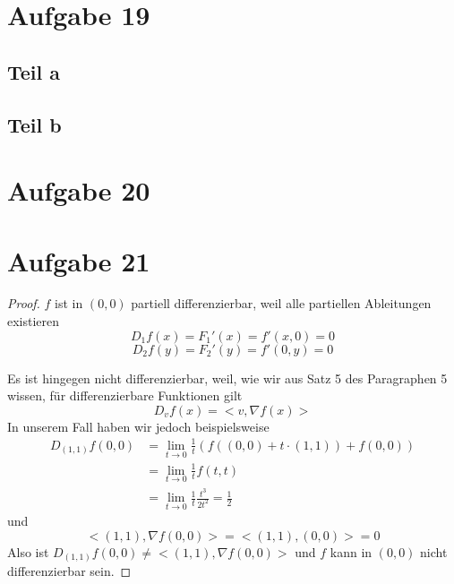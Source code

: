 \documentclass[10pt,a4paper]{article}
\begin{document}
\section*{Aufgabe 19}

\subsection*{Teil a}

\subsection*{Teil b}

\section*{Aufgabe 20}

\section*{Aufgabe 21}

\begin{proof}
$f$ ist in $(0, 0)$ partiell differenzierbar, weil alle partiellen Ableitungen existieren
\begin{equation}
D_{1}f(x) = F_{1}'(x) = f'(x, 0) = 0
\end{equation}
\begin{equation}
D_{2}f(y) = F_{2}'(y) = f'(0, y) = 0
\end{equation}

Es ist hingegen nicht differenzierbar, weil, wie wir aus Satz 5 des Paragraphen 5 wissen, für differenzierbare Funktionen gilt
\begin{equation}
D_{v}f(x) = <v, \nabla f(x)>
\end{equation}
In unserem Fall haben wir jedoch beispielsweise
\begin{align*}
D_{(1, 1)}f(0, 0) & = \lim_{t \rightarrow 0} \frac{1}{t} (f((0, 0) + t \cdot (1, 1)) + f(0, 0))\\
& = \lim_{t \rightarrow 0} \frac{1}{t} f(t, t)\\
& = \lim_{t \rightarrow 0} \frac{1}{t} \frac{t^{3}}{2t^{2}} = \frac{1}{2}
\end{align*}
und
\begin{equation}
<(1, 1), \nabla f(0, 0)> = <(1, 1), (0, 0)> = 0
\end{equation}
Also ist $D_{(1, 1)}f(0, 0) \ne <(1, 1), \nabla f(0, 0)>$ und $f$ kann in $(0, 0)$ nicht differenzierbar sein.
\end{proof}
\end{document}
